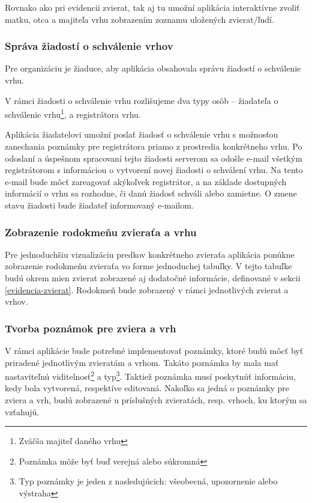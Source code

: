 Rovnako ako pri evidencii zvierat, tak aj tu umožní aplikácia interaktívne zvoliť matku, otca a majiteľa vrhu zobrazením zoznamu uložených zvierat/ľudí.

\subsubsection{Správa žiadostí o schválenie vrhov}\label{sprava-ziadosti-o-schvalenie-vrhu}
Pre organizáciu je žiaduce, aby aplikácia obsahovala správu žiadostí o schválenie vrhu.

V rámci žiadosti o schválenie vrhu rozlišujeme dva typy osôb -- žiadateľa o schválenie vrhu\footnote{Zväčša majiteľ daného vrhu}, a registrátora vrhu.

Aplikácia žiadatelovi umožní poslať žiadosť o schválenie vrhu s možnosťou zanechania poznámky pre registrátora priamo z prostredia konkrétneho vrhu.
Po odoslaní a úspešnom spracovaní tejto žiadosti serverom sa odošle e-mail všetkým registrátorom s informáciou o vytvorení novej žiadosti o schválení vrhu. Na tento e-mail bude môcť zareagovať akýkoľvek registrátor, a na základe dostupných informácií o vrhu sa rozhodne, či danú žiadosť schváli alebo zamietne.
O zmene stavu žiadosti bude žiadateľ informovaný e-mailom.

\subsubsection{Zobrazenie rodokmeňu zvieraťa a vrhu}\label{rodokmene}
Pre jednoduchšiu vizualizáciu predkov konkrétneho zvieraťa aplikácia ponúkne zobrazenie rodokmeňu zvieraťa vo forme jednoduchej tabuľky. V tejto tabuľke budú okrem mien zvierat zobrazené aj dodatočné informácie, definované v sekcii \ref{evidencia-zvierat}. Rodokmeň bude zobrazený v rámci jednotlivých zvierat a vrhov.

\subsubsection{Tvorba poznámok pre zviera a vrh}
V rámci aplikácie bude potrebné implementovať poznámky, ktoré budú môcť byť priradené jednotlivým zvieratám a vrhom.
Takáto poznámka by mala mať nastaviteľnú viditelnosť\footnote{Poznámka môže byť buď verejná alebo súkromná} a typ\footnote{Typ poznámky je jeden z nasledujúcich: všeobecná, upozornenie alebo výstraha}.
Taktiež poznámka musí poskytnúť informáciu, kedy bola vytvorená, respektíve editovaná.
Nakoľko sa jedná o poznámky pre zviera a vrh, budú zobrazené u príslušných zvieratách, resp. vrhoch, ku ktorým sa vzťahujú.

